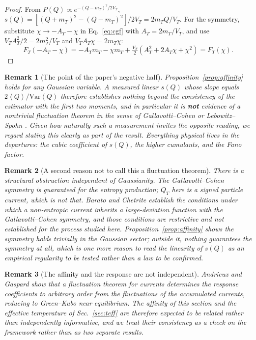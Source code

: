 \documentclass[aps,pre,twocolumn,superscriptaddress,floatfix,nofootinbib]{revtex4-2}
\newcommand{\avg}[1]{\left\langle #1 \right\rangle}
\newcommand{\Var}{\mathrm{Var}}
\newtheorem{remark}{Remark}
\begin{document}
\begin{proof}
From $P(Q)\propto e^{-(Q-m_T)^2/2V_T}$,
$s(Q)=[(Q+m_T)^2-(Q-m_T)^2]/2V_T=2m_TQ/V_T$. For the symmetry, substitute
$\chi\to-A_T-\chi$ in Eq.~\eqref{eq:cgf} with $A_T=2m_T/V_T$, and use
$V_TA_T^2/2=2m_T^2/V_T$ and $V_TA_T\chi=2m_T\chi$:
\begin{equation}
  F_T(-A_T-\chi)=-A_Tm_T-\chi m_T+\tfrac{V_T}{2}(A_T^2+2A_T\chi+\chi^2)
                =F_T(\chi).
\end{equation}
\end{proof}

\begin{remark}[The point of the paper's negative half]
\label{rem:trivial}
Proposition~\ref{prop:affinity} holds for \emph{any} Gaussian variable. A
measured linear $s(Q)$ whose slope equals $2\avg{Q}/\Var(Q)$ therefore
establishes nothing beyond the consistency of the estimator with the first two
moments, and in particular it is \textbf{not} evidence of a nontrivial
fluctuation theorem in the sense of
Gallavotti--Cohen or Lebowitz--Spohn
\cite{gallavotti1995,lebowitz1999}. Given how naturally such a measurement
invites the opposite reading, we regard stating this clearly as part of the
result. Everything physical lives in the departures: the cubic coefficient of
$s(Q)$, the higher cumulants, and the Fano factor.
\end{remark}

\begin{remark}[A second reason not to call this a fluctuation theorem]
There is a structural obstruction independent of Gaussianity. The
Gallavotti--Cohen symmetry is guaranteed for the entropy production; $Q_T$ here
is a signed particle current, which is not that. Barato and Chetrite
\cite{barato2012} establish the conditions under which a non-entropic current
inherits a large-deviation function with the Gallavotti--Cohen symmetry, and
those conditions are restrictive and not established for the process studied
here. Proposition~\ref{prop:affinity} shows the symmetry holds trivially in the
Gaussian sector; outside it, nothing guarantees the symmetry at all, which is
one more reason to read the linearity of $s(Q)$ as an empirical regularity to
be tested rather than a law to be confirmed.
\end{remark}

\begin{remark}[The affinity and the response are not independent]
Andrieux and Gaspard \cite{andrieux2007jstat} show that a fluctuation theorem
for currents determines the response coefficients to arbitrary order from the
fluctuations of the accumulated currents, reducing to Green--Kubo near
equilibrium. The affinity of this section and the effective temperature of
Sec.~\ref{sec:teff} are therefore expected to be related rather than
independently informative, and we treat their consistency as a check on the
framework rather than as two separate results.
\end{remark}
\end{document}
